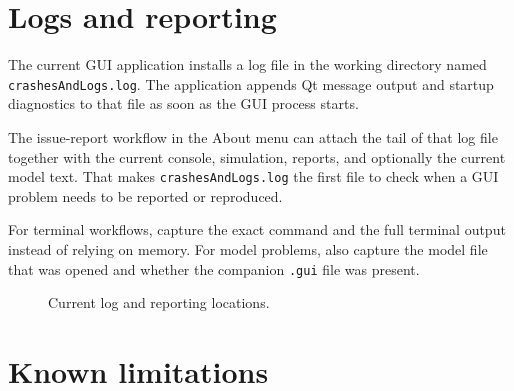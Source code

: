 \section{Logs and reporting}
\label{sec:troubleshooting-logs}

The current GUI application installs a log file in the working directory named
\texttt{crashesAndLogs.log}. The application appends Qt message output and
startup diagnostics to that file as soon as the GUI process starts.

The issue-report workflow in the About menu can attach the tail of that log
file together with the current console, simulation, reports, and optionally the
current model text. That makes \texttt{crashesAndLogs.log} the first file to
check when a GUI problem needs to be reported or reproduced.

For terminal workflows, capture the exact command and the full terminal output
instead of relying on memory. For model problems, also capture the model file
that was opened and whether the companion \texttt{.gui} file was present.

\begin{figure}[htbp]
\centering
\caption{Current log and reporting locations.}
\label{fig:troubleshooting-log-locations}
\end{figure}

\section{Known limitations}
\label{sec:troubleshooting-known-limitations}

